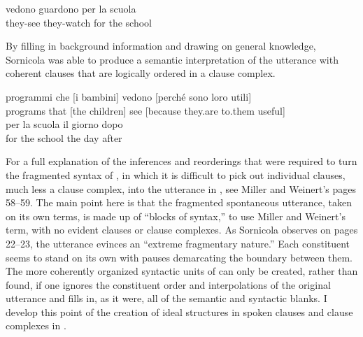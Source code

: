 \gll vedono  guardono   per la scuola\\
they-see     they-watch  for the school\\
\z

\noindent By filling in background information and drawing on general knowledge, Sornicola was able to produce a semantic interpretation of the utterance with coherent clauses that are logically ordered in a clause complex.

\ea%
    \label{ex:4:7}
\gll   programmi  che   [i bambini]    vedono   [perché  sono        loro   utili]\\
      programs   that   [the children]  see     [because  they.are   to.them   useful]\\

\gll per  la scuola   il giorno  dopo\\
for   the school   the day   after\\
\z

\noindent For a full explanation of the inferences and reorderings that were required to turn the fragmented syntax of , in which it is difficult to pick out individual clauses, much less a clause complex, into the utterance in , see Miller and Weinert’s pages 58--59. The main point here is that the fragmented spontaneous utterance, taken on its own terms, is made up of “blocks of syntax,” to use Miller and Weinert’s term, with no evident clauses or clause complexes. As Sornicola observes on pages 22--23, the utterance evinces an “extreme fragmentary nature.” Each constituent seems to stand on its own with pauses demarcating the boundary between them. The more coherently organized syntactic units of  can only be created, rather than found, if one ignores the constituent order and interpolations of the original utterance and fills in, as it were, all of the semantic and syntactic blanks. I develop this point of the creation of ideal structures in spoken clauses and clause complexes in .

